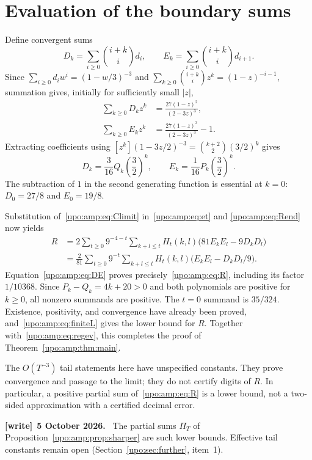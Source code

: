 \documentclass[11pt,letterpaper]{article}
\theoremstyle{remark}\newtheorem{remark}[theorem]{Remark}
\numberwithin{equation}{section}
\newenvironment{writenote}[1][]{\par\smallskip\begingroup\small
 \noindent\textbf{[write]}\if\relax\detokenize{#1}\relax\else~\textbf{#1.}\fi\ }%
 {\par\endgroup\smallskip}
\begin{document}
\section{Evaluation of the boundary sums}\label{upo:amp:sec:sums}
Define convergent sums
\[
D_k=\sum_{i\ge0}\binom{i+k}{i}d_i,
\qquad E_k=\sum_{i\ge0}\binom{i+k}{i}d_{i+1}.
\]
Since $\sum_{i\ge0}d_iw^i=(1-w/3)^{-3}$ and
$\sum_{k\ge0}\binom{i+k}{i}z^k=(1-z)^{-i-1}$, summation gives,
initially for sufficiently small $|z|$,
\begin{align*}
\sum_{k\ge0}D_kz^k&=\frac{27(1-z)^2}{(2-3z)^3},\\
\sum_{k\ge0}E_kz^k&=\frac{27(1-z)^3}{(2-3z)^3}-1.
\end{align*}
Extracting coefficients using
$[z^k](1-3z/2)^{-3}=\binom{k+2}{2}(3/2)^k$ gives
\begin{equation}\label{upo:amp:eq:DE}
D_k=\frac3{16}Q_k\left(\frac32\right)^k,
\qquad E_k=\frac1{16}P_k\left(\frac32\right)^k.
\end{equation}
The subtraction of $1$ in the second generating function is essential
at $k=0$: $D_0=27/8$ and $E_0=19/8$.

Substitution of~\eqref{upo:amp:eq:Climit} in~\eqref{upo:amp:eq:et} and
\eqref{upo:amp:eq:Rend} now yields
\begin{align*}
R&=2\sum_{t\ge0}9^{-4-t}\sum_{k+l\le t}H_t(k,l)
\bigl(81E_kE_l-9D_kD_l\bigr)\\
&=\frac2{81}\sum_{t\ge0}9^{-t}\sum_{k+l\le t}H_t(k,l)
\bigl(E_kE_l-D_kD_l/9\bigr).
\end{align*}
Equation~\eqref{upo:amp:eq:DE} proves precisely~\eqref{upo:amp:eq:R}, including its
factor $1/10368$. Since $P_k-Q_k=4k+20>0$ and both polynomials are
positive for $k\ge0$, all nonzero summands are positive. The $t=0$
summand is $35/324$. Existence, positivity, and convergence have already
been proved, and~\eqref{upo:amp:eq:finiteL} gives the lower bound for $R$.
Together with~\eqref{upo:amp:eq:regev}, this completes the proof of
Theorem~\ref{upo:amp:thm:main}.

The $O(T^{-3})$ tail statements here have unspecified constants. They
prove convergence and passage to the limit; they do not certify digits
of $R$. In particular, a positive partial sum of~\eqref{upo:amp:eq:R} is a lower
bound, not a two-sided approximation with a certified decimal error.
\begin{writenote}[5 October 2026]
The partial sums $\Pi_T$ of Proposition~\ref{upo:amp:prop:sharper} are such lower bounds. Effective tail constants remain open (Section~\ref{upo:sec:further}, item~1).
\end{writenote}
\end{document}
